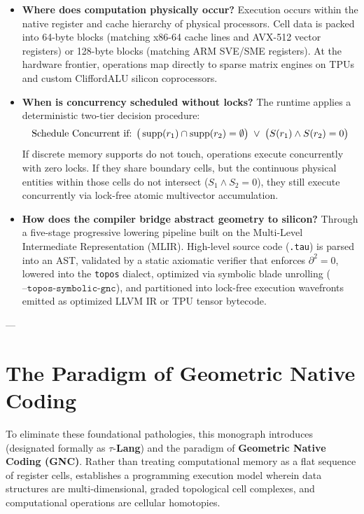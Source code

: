 \begin{itemize}[leftmargin=1.2cm]
    \item \textbf{Where does computation physically occur?}  
    Execution occurs within the native register and cache hierarchy of physical processors. Cell data is packed into 64-byte blocks (matching x86-64 cache lines and AVX-512 vector registers) or 128-byte blocks (matching ARM SVE/SME registers). At the hardware frontier, operations map directly to sparse matrix engines on TPUs and custom CliffordALU silicon coprocessors.

    \item \textbf{When is concurrency scheduled without locks?}  
    The runtime applies a deterministic two-tier decision procedure:
    \begin{equation}
        \text{Schedule Concurrent if: } \big(\operatorname{supp}(r_1) \cap \operatorname{supp}(r_2) = \emptyset\big) \;\lor\; \big(S(r_1) \wedge S(r_2) = 0\big)
    \end{equation}
    If discrete memory supports do not touch, operations execute concurrently with zero locks. If they share boundary cells, but the continuous physical entities within those cells do not intersect ($S_1 \wedge S_2 = 0$), they still execute concurrently via lock-free atomic multivector accumulation.

    \item \textbf{How does the compiler bridge abstract geometry to silicon?}  
    Through a five-stage progressive lowering pipeline built on the Multi-Level Intermediate Representation (MLIR). High-level source code (\texttt{.tau}) is parsed into an AST, validated by a static axiomatic verifier that enforces $\partial^2 = 0$, lowered into the \texttt{topos} dialect, optimized via symbolic blade unrolling ($\texttt{--topos-symbolic-gnc}$), and partitioned into lock-free execution wavefronts emitted as optimized LLVM IR or TPU tensor bytecode.
\end{itemize}

---

\section{The Paradigm of Geometric Native Coding}
\label{sec:gnc_paradigm}

To eliminate these foundational pathologies, this monograph introduces \ToposLang{} (designated formally as $\tau$-\textbf{Lang}) and the paradigm of \textbf{Geometric Native Coding (GNC)}. Rather than treating computational memory as a flat sequence of register cells, \ToposLang{} establishes a programming execution model wherein data structures are multi-dimensional, graded topological cell complexes, and computational operations are cellular homotopies.

